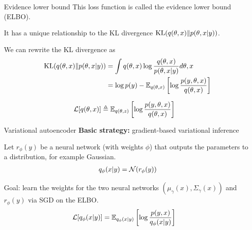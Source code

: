 \documentclass[10pt, compress]{beamer}
\begin{document}
\fi

\begin{frame}{Evidence lower bound}
  This loss function is called the \alert{evidence lower bound} (ELBO).
  
  \pause
  
  It has a unique relationship to the KL divergence $ \textrm{KL}(q(\theta, x)\|p(\theta, x|y))$.

  \pause
  We can rewrite the KL divergence as
  \begin{align*}
    \textrm{KL}(q(\theta, x)\|p(\theta, x|y)) &= \int q(\theta, x)\log\frac{q(\theta, x)}{p(\theta, x | y)}d\theta, x \\
              &= \log p(y) - \mathbb{E}_{q(\theta, x)}\left[\log\frac{p(y, \theta, x)}{q(\theta, x)}\right]
  \end{align*}

  \pause
  
  \begin{align*}
    \mathcal{L}[q(\theta, x)] &\triangleq \mathbb{E}_{q(\theta, z)}\left[\log\frac{p(y, \theta, x)}{q(\theta, x)}\right]
  \end{align*}
\end{frame}

\begin{frame}{Variational autoencoder}
  \textbf{Basic strategy:} gradient-based variational inference

  \pause

  \begin{center}
  \end{center}

  \pause
  Let $r_\phi(y)$ be a neural network (with weights $\phi$)
  that outputs the parameters to a distribution, for example Gaussian.
  \begin{align*}
    q_\phi(x | y) = \mathcal{N}(r_\phi(y))
  \end{align*}

  \pause
  Goal: learn the weights for the two neural networks $(\mu_\gamma(x), \Sigma_\gamma(x))$ and $r_\phi(y)$
  via SGD on the ELBO.
  \pause
  \begin{align*}
    \mathcal{L}[q_\phi(x | y)] &= \mathbb{E}_{q_\phi(x | y)}\left[\log\frac{p(y, x)}{q_\phi(x | y)}\right]
  \end{align*}
\end{frame}
\end{document}
